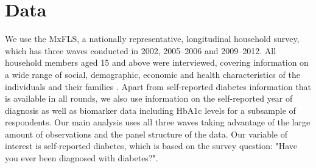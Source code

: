 \documentclass[12pt,english]{article}
\begin{document}
\section{\label{sec:Data}Data}

We use the \acf{MxFLS}, a nationally representative, longitudinal household survey, which has three waves conducted in 2002, 2005--2006 and 2009--2012. All household members aged 15 and above were interviewed, covering information on a wide range of social, demographic, economic and health characteristics of the individuals and their families \parencite{Rubalcava2013}. Apart from self-reported diabetes information that is available in all rounds, we also use information on the self-reported year of diagnosis as well as biomarker data including \ac{HbA1c} levels for a subsample of respondents.  Our main analysis uses all three waves taking advantage of the large amount of observations and the panel structure of the data. Our variable of interest is self-reported diabetes, which is based on the survey question: "Have you ever been diagnosed with diabetes?". 
\end{document}
